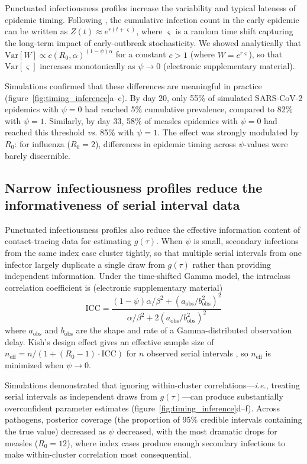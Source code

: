 \documentclass[10pt]{article}
\makeatletter
\newcommand{\ie}{\textit{i.e.}\@\xspace}
\newcommand{\vs}{\textit{vs.}\@\xspace}
\makeatother
\begin{document}
Punctuated infectiousness profiles increase the variability and typical lateness of epidemic timing. Following \citet{morris_computation_2024}, the cumulative infection count in the early epidemic can be written as $Z(t) \approx e^{r(t + \varsigma)}$, where $\varsigma$ is a random time shift capturing the long-term impact of early-outbreak stochasticity. We showed analytically that $\text{Var}[W] \propto c(R_0, \alpha)^{(1-\psi)\alpha}$ for a constant $c > 1$ (where $W = e^{r\varsigma}$), so that $\text{Var}[\varsigma]$ increases monotonically as $\psi \to 0$ (electronic supplementary material).

Simulations confirmed that these differences are meaningful in practice (figure~\ref{fig:timing_inference}a--c). By day 20, only 55\% of simulated SARS-CoV-2 epidemics with $\psi = 0$ had reached 5\% cumulative prevalence, compared to 82\% with $\psi = 1$. Similarly, by day 33, 58\% of measles epidemics with $\psi = 0$ had reached this threshold \vs 85\% with $\psi = 1$. The effect was strongly modulated by $R_0$: for influenza ($R_0 = 2$), differences in epidemic timing across $\psi$-values were barely discernible.

\subsection{Narrow infectiousness profiles reduce the informativeness of serial interval data}

Punctuated infectiousness profiles also reduce the effective information content of contact-tracing data for estimating $g(\tau)$. When $\psi$ is small, secondary infections from the same index case cluster tightly, so that multiple serial intervals from one infector largely duplicate a single draw from $g(\tau)$ rather than providing independent information. Under the time-shifted Gamma model, the intraclass correlation coefficient is (electronic supplementary material)
\begin{equation}
	\text{ICC} = \frac{(1-\psi)\alpha / \beta^2 + (a_\text{obs}/b_\text{obs}^2)^2}{\alpha / \beta^2 + 2(a_\text{obs}/b_\text{obs}^2)^2}
\end{equation}
where $a_\text{obs}$ and $b_\text{obs}$ are the shape and rate of a Gamma-distributed observation delay. Kish's design effect gives an effective sample size of $n_\text{eff} = n / (1 + (R_0 - 1) \cdot \text{ICC})$ for $n$ observed serial intervals \citep{}, so $n_\text{eff}$ is minimized when $\psi \to 0$.

Simulations demonstrated that ignoring within-cluster correlations---\ie, treating serial intervals as independent draws from $g(\tau)$---can produce substantially overconfident parameter estimates (figure~\ref{fig:timing_inference}d--f). Across pathogens, posterior coverage (the proportion of 95\% credible intervals containing the true value) decreased as $\psi$ decreased, with the most dramatic drops for measles ($R_0 = 12$), where index cases produce enough secondary infections to make within-cluster correlation most consequential.
\end{document}
